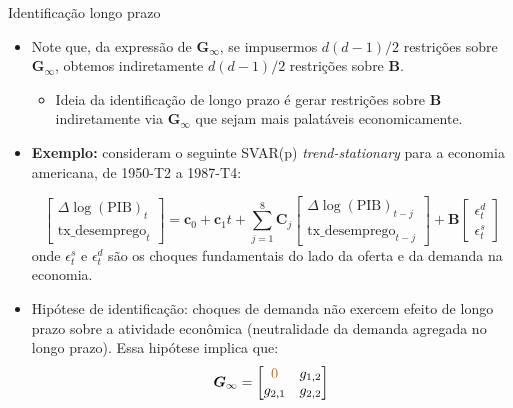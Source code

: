 \documentclass[11pt]{beamer}
\begin{document}
\begin{frame}{Identificação longo prazo}
	\begin{itemize}
	\item Note que, da expressão de $\boldsymbol{G}_\infty$, se impusermos $d(d-1)/2$ restrições sobre $\boldsymbol{G}_\infty$, obtemos indiretamente  $d(d-1)/2$ restrições sobre $\boldsymbol{B}$.
	\begin{itemize}
		\item Ideia da identificação de longo prazo é gerar restrições sobre $\boldsymbol{B}$ indiretamente via $\boldsymbol{G}_\infty$ que sejam mais palatáveis economicamente.
	\end{itemize}

			\item \textbf{Exemplo:} \citet{blanchard1989dynamic} consideram o seguinte SVAR(p) \textit{trend-stationary} para a economia americana, de 1950-T2 a 1987-T4:
			
			$$\begin{bmatrix}
				\Delta \log(\text{PIB})_t \\
				\text{tx\_desemprego}_t  			\end{bmatrix} = \boldsymbol{c}_0 +\boldsymbol{c}_1 t + \sum_{j=1}^8\boldsymbol{C}_j \begin{bmatrix}
				\Delta \log(\text{PIB})_{t-j} \\
				\text{tx\_desemprego}_{t-j} 			\end{bmatrix}  + \boldsymbol{B} \begin{bmatrix}
					\epsilon^d_t \\
					\epsilon^s_t
				\end{bmatrix}
$$
	onde $\epsilon^s_t$ e $\epsilon^d_t$ são os choques fundamentais do lado da oferta e da demanda na economia. 
	\item {\color{red}Hipótese de identificação:} choques de demanda não exercem efeito de longo prazo sobre a atividade econômica (neutralidade da demanda agregada no longo prazo). Essa hipótese implica que:
	$$\boldsymbol{G}_\infty  = \begin{bmatrix}
	{\color{red}0} & g_{1,2}\\
		g_{2,1} & g_{2,2}
	\end{bmatrix}$$
\end{itemize}
\end{frame}
\end{document}
